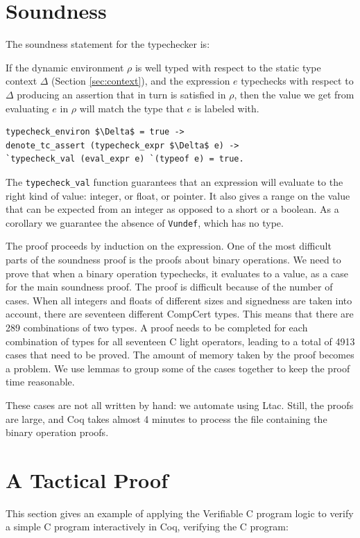 \documentclass{puthesis}
\begin{document}
 
\section{Soundness}
\label{sec:tc_sound}
The soundness statement for the typechecker is:

If the dynamic environment $\rho$ is well typed with respect to the
static type context $\Delta$ (Section \ref{sec:context}), and the
expression $e$ typechecks with respect to $\Delta$ producing an
assertion that in turn is satisfied in $\rho$, then the value we get
from evaluating $e$ in $\rho$ will match the type that $e$ is labeled
with.

\begin{lstlisting}
typecheck_environ $\Delta$ = true -> 
denote_tc_assert (typecheck_expr $\Delta$ e) ->
`typecheck_val (eval_expr e) `(typeof e) = true.
\end{lstlisting} 

The \lstinline|typecheck_val| function guarantees that an expression
will evaluate to the right kind of value: integer, or float, or
pointer. It also gives a range on the value that can be expected from
an integer as opposed to a short or a boolean.  As a corollary we
guarantee the absence of \lstinline|Vundef|, which has no type.

The proof proceeds by induction on the expression.  One of the most
difficult parts of the soundness proof is the proofs about binary
operations. We need to prove that when a binary operation typechecks,
it evaluates to a value, as a case for the main soundness proof. The
proof is difficult because of the number of cases. When all integers
and floats of different sizes and signedness are taken into account,
there are seventeen different CompCert types. This means that there
are 289 combinations of two types. A proof needs to be completed for
each combination of types for all seventeen C light operators, leading
to a total of 4913 cases that need to be proved.  The amount of memory
taken by the proof becomes a problem. We use lemmas to group some of
the cases together to keep the proof time reasonable.

These cases are not all written by hand: we automate using Ltac.
Still, the proofs are large, and Coq takes almost 4 minutes to process
the file containing the binary operation proofs.


\section{A Tactical Proof}
\label{sec:example}
This section gives an example of applying the Verifiable C program logic to
verify a simple C program interactively in Coq, verifying the C
program:
\end{document}
